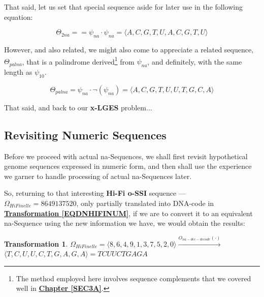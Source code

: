 \documentclass[a4paper, 18pt]{book} %
\newtheorem{trans}{Transformation}
\begin{document}
That said, let us set that special sequence aside for later use in the following equation:

\vspace{1em}
\begin{equation}
\label{EQDUPLNASEQ}
\Theta_{2na} =  = \psi_{na} \cdot \psi_{na} = \langle A , C , G , T , U , A , C , G , T , U \rangle
\end{equation}
\vspace{1em}


However, and also related, we might also come to appreciate a related sequence, $\Theta_{palna}$, that is a palindrome derived\footnote{The method employed here involves sequence complements that we covered well in \textbf{\hyperref[SEC3A]{Chapter \ref{SEC3A}}}.} from $\psi_{na}$, and definitely, with the same length as $\psi_{10}$.


\vspace{1em}
\begin{equation}
\label{EQPALNASEQ}
\Theta_{palna} = \psi_{na} \cdot \lnot(\psi_{na}) =  \langle A , C , G , T , U , U , T , G , C , A \rangle
\end{equation}
\vspace{1em}


That said, and back to our \textbf{x-LGES} problem...


\subsection{Revisiting Numeric Sequences}

Before we proceed with actual na-Sequences, we shall first revisit hypothetical genome sequences expressed in numeric form, and then shall use the experience we garner to handle processing of actual na-Sequences later.

So, returning to that interesting \textbf{Hi-Fi o-SSI} sequence --- $\Omega_{HiFinelle} = 8649137520$, only partially translated into DNA-code in  \textbf{\hyperref[EQDNHIFINUM]{Transformation \ref{EQDNHIFINUM}}}, if we are to convert it to an equivalent na-Sequence using the new information we have, we would obtain the results:

\vspace{1em}
\begin{trans}
\label{EQDNHIFINUMCOMPLETE}
$\Omega_{HiFinelle} = \langle 8,6,4,9,1,3,7,5,2,0 \rangle \xrightarrow{O_{na-dec-decode}(\cdot)}$\\
$  \langle T,C,U,U,C,T,G,A,G,A \rangle = TCUUCTGAGA$\\
\end{trans}
\vspace{1em}
\end{document}
